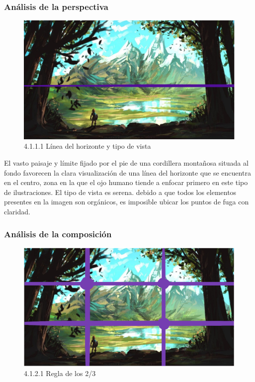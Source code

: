 \documentclass[12pt]{article}
\begin{document}
    
        \subsubsection{Análisis de la perspectiva}


    \begin{figure}[H]
      \centering
      \includegraphics[scale=0.4]{images/Nerea/Nerea Zelda concept 111.PNG}
      \caption{\small 4.1.1.1 Línea del horizonte y tipo de vista}
    \end{figure}

    El vasto paisaje y límite fijado por el pie de una cordillera montañosa situada al fondo favorecen la clara visualización de una línea del horizonte que se encuentra en el centro, zona en la que el ojo humano tiende a enfocar primero en este tipo de ilustraciones. El tipo de vista es serena.
    debido a que todos los elementos presentes en la imagen son orgánicos, es imposible ubicar los puntos de fuga con claridad.


        \subsubsection{Análisis de la composición}

        
    \begin{figure}[H]
      \centering
      \includegraphics[scale=0.4]{images/Nerea/Nerea Zelda concept 121.PNG}
      \caption{\small 4.1.2.1 Regla de los 2/3}
    \end{figure}
\end{document}
